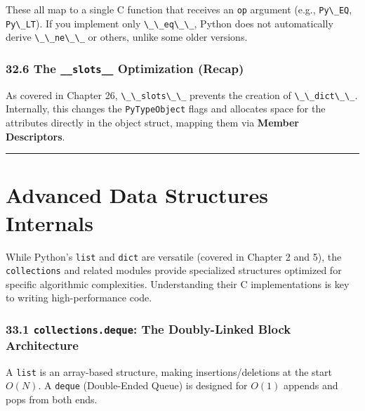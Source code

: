 These all map to a single C function that receives an
\passthrough{\lstinline!op!} argument (e.g.,
\passthrough{\lstinline!Py\_EQ!}, \passthrough{\lstinline!Py\_LT!}). If
you implement only \passthrough{\lstinline!\_\_eq\_\_!}, Python does not
automatically derive \passthrough{\lstinline!\_\_ne\_\_!} or others,
unlike some older versions.

\hypertarget{the-__slots__-optimization-recap}{%
\subsection{\texorpdfstring{32.6 The \texttt{\_\_slots\_\_} Optimization
(Recap)}{32.6 The \_\_slots\_\_ Optimization (Recap)}}\label{the-__slots__-optimization-recap}}

As covered in Chapter 26, \passthrough{\lstinline!\_\_slots\_\_!}
prevents the creation of \passthrough{\lstinline!\_\_dict\_\_!}.
Internally, this changes the \passthrough{\lstinline!PyTypeObject!}
flags and allocates space for the attributes directly in the object
struct, mapping them via \textbf{Member Descriptors}.

\begin{center}\rule{0.5\linewidth}{0.5pt}\end{center}

\hypertarget{advanced-data-structures-internals}{%
\chapter{Advanced Data Structures
Internals}\label{advanced-data-structures-internals}}

While Python's \passthrough{\lstinline!list!} and
\passthrough{\lstinline!dict!} are versatile (covered in Chapter 2 and
5), the \passthrough{\lstinline!collections!} and related modules
provide specialized structures optimized for specific algorithmic
complexities. Understanding their C implementations is key to writing
high-performance code.

\hypertarget{collections.deque-the-doubly-linked-block-architecture}{%
\subsection{\texorpdfstring{33.1 \texttt{collections.deque}: The
Doubly-Linked Block
Architecture}{33.1 collections.deque: The Doubly-Linked Block Architecture}}\label{collections.deque-the-doubly-linked-block-architecture}}

A \passthrough{\lstinline!list!} is an array-based structure, making
insertions/deletions at the start \(O(N)\). A
\passthrough{\lstinline!deque!} (Double-Ended Queue) is designed for
\(O(1)\) appends and pops from both ends.

